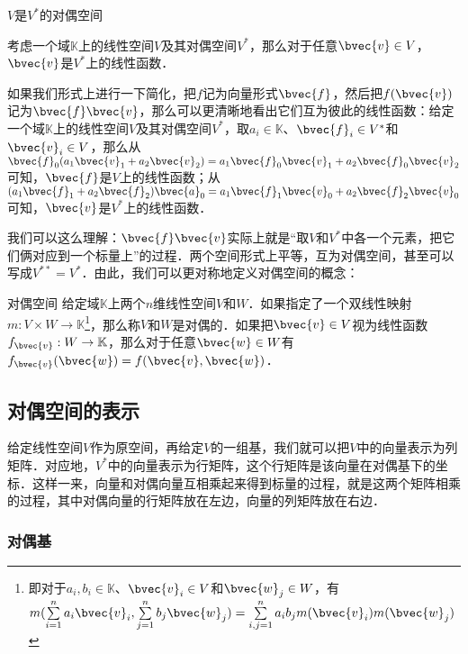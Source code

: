 \begin{theorem}{$V$是$V^*$的对偶空间}

考虑一个域$\mathbb{K}$上的线性空间$V$及其对偶空间$V^*$，那么对于任意$\bvec{v}\in V$，$\bvec{v}$是$V^*$上的线性函数．

\end{theorem}

如果我们形式上进行一下简化，把$f$记为向量形式$\bvec{f}$，然后把$f(\bvec{v})$记为$\bvec{f}\bvec{v}$，那么可以更清晰地看出它们互为彼此的线性函数：给定一个域$\mathbb{K}$上的线性空间$V$及其对偶空间$V^*$，取$a_i\in\mathbb{K}$、$\bvec{f}_i\in V^*$和$\bvec{v}_i\in V$，那么从$\bvec{f}_0(a_1\bvec{v}_1+a_2\bvec{v}_2)=a_1\bvec{f}_0\bvec{v}_1+a_2\bvec{f}_0\bvec{v}_2$可知，$\bvec{f}$是$V$上的线性函数；从$(a_1\bvec{f}_1+a_2\bvec{f}_2)\bvec{a}_0=a_1\bvec{f}_1\bvec{v}_0+a_2\bvec{f}_2\bvec{v}_0$可知，$\bvec{v}$是$V^*$上的线性函数．

我们可以这么理解：$\bvec{f}\bvec{v}$实际上就是“取$V$和$V^*$中各一个元素，把它们俩对应到一个标量上”的过程．两个空间形式上平等，互为对偶空间，甚至可以写成$V^{**}=V^*$．由此，我们可以更对称地定义对偶空间的概念：

\begin{definition}{对偶空间}
给定域$\mathbb{K}$上两个$n$维线性空间$V$和$W$．如果指定了一个双线性映射$m:V\times W\rightarrow\mathbb{K}$\footnote{即对于$a_i, b_i\in\mathbb{K}$、$\bvec{v}_i\in V$和$\bvec{w}_j\in W$，有$m(\sum\limits_{i=1}^na_i\bvec{v}_i,\sum\limits_{j=1}^nb_j\bvec{w}_j )=\sum\limits_{i, j=1}^na_ib_jm(\bvec{v}_i)m(\bvec{w}_j)$}，那么称$V$和$W$是对偶的．如果把$\bvec{v}\in V$视为线性函数$f_\bvec{v}:W\rightarrow\mathbb{K}$，那么对于任意$\bvec{w}\in W$有$f_\bvec{v}(\bvec{w})=f(\bvec{v}, \bvec{w})$．
\end{definition}


\subsection{对偶空间的表示}%

给定线性空间$V$作为原空间，再给定$V$的一组基，我们就可以把$V$中的向量表示为列矩阵．对应地，$V^*$中的向量表示为行矩阵，这个行矩阵是该向量在对偶基下的坐标．这样一来，向量和对偶向量互相乘起来得到标量的过程，就是这两个矩阵相乘的过程，其中对偶向量的行矩阵放在左边，向量的列矩阵放在右边．


\subsubsection{对偶基}

